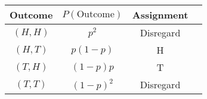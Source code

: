 \begin{tabular}{c c c c}
\hline
Outcome & $P\left(\text{Outcome}\right)$ & Assignment \\
\hline
\hline
$\left(H, H\right)$ & $p^{2}$ & Disregard \\
$\left(H, T\right)$ & $p\left(1-p\right)$ & H \\
$\left(T, H\right)$ & $\left(1-p\right)p$ & T \\
$\left(T, T\right)$ & $\left(1-p\right)^{2}$ & Disregard \\
\end{tabular}
